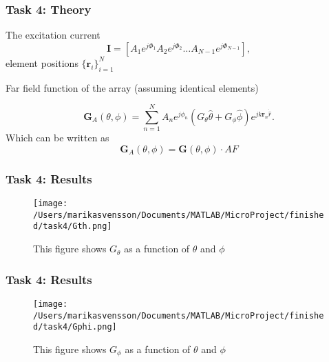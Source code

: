 \begin{frame}
\frametitle{Task 4: Theory}
The excitation current 
\begin{equation}
\mathbf{I} =[A_1e^{j\Phi_1} A_2e^{j\Phi_2} \dots A_{N-1}e^{j\Phi_{N-1}}],
\end{equation}
 element positions $\{\mathbf{r}_i\}_{i=1}^N$

Far field function of the array (assuming identical elements)


\begin{equation}
\mathbf{G}_A(\theta, \phi) = \sum_{n=1}^N A_ne^{j\phi_n}(G_{\theta}\hat{\theta} + G_{\phi}\hat{\phi}) e^{jk\mathbf{r}_n\dot{\hat{r}}}.
\end{equation}
Which can be written as 
\begin{equation}
\mathbf{G}_A(\theta, \phi) = \mathbf{G}(\theta, \phi) \cdot AF
\end{equation}


\end{frame}



\begin{frame}
\frametitle{Task 4: Results}
\begin{figure}[h]
\centering
\texttt{[image: /Users/marikasvensson/Documents/MATLAB/MicroProject/finished/task4/Gth.png]}
\caption{This figure shows $G_\theta$ as a function of $\theta$ and $\phi$}
\label{task4:Gth}
\end{figure}




\end{frame}


\begin{frame}
\frametitle{Task 4: Results}
\begin{figure}[h]
\centering
\texttt{[image: /Users/marikasvensson/Documents/MATLAB/MicroProject/finished/task4/Gphi.png]}
\caption{This figure shows $G_\phi$ as a function of $\theta$ and $\phi$}
\label{task4:Gphi}
\end{figure}


\end{frame}